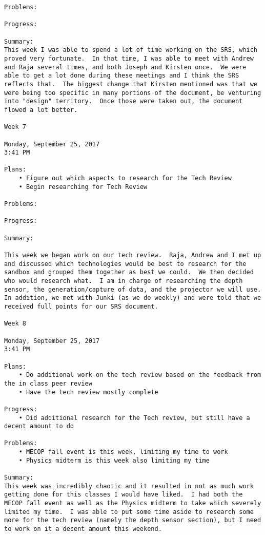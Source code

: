 \begin{lstlisting}
Problems:

Progress:

Summary:
This week I was able to spend a lot of time working on the SRS, which proved very fortunate.  In that time, I was able to meet with Andrew and Raja several times, and both Joseph and Kirsten once.  We were able to get a lot done during these meetings and I think the SRS reflects that.  The biggest change that Kirsten mentioned was that we were being too specific in many portions of the document, be venturing into "design" territory.  Once those were taken out, the document flowed a lot better.

Week 7

Monday, September 25, 2017
3:41 PM

Plans:
	• Figure out which aspects to research for the Tech Review
	• Begin researching for Tech Review

Problems:

Progress:

Summary:

This week we began work on our tech review.  Raja, Andrew and I met up and discussed which technologies would be best to research for the sandbox and grouped them together as best we could.  We then decided who would research what.  I am in charge of researching the depth sensor, the generation/capture of data, and the projector we will use.  In addition, we met with Junki (as we do weekly) and were told that we received full points for our SRS document.

Week 8

Monday, September 25, 2017
3:41 PM

Plans:
	• Do additional work on the tech review based on the feedback from the in class peer review
	• Have the tech review mostly complete

Progress:
	• Did additional research for the Tech review, but still have a decent amount to do

Problems:
	• MECOP fall event is this week, limiting my time to work
	• Physics midterm is this week also limiting my time

Summary:
This week was incredibly chaotic and it resulted in not as much work getting done for this classes I would have liked.  I had both the MECOP fall event as well as the Physics midterm to take which severely limited my time.  I was able to put some time aside to research some more for the tech review (namely the depth sensor section), but I need to work on it a decent amount this weekend.


\end{lstlisting}
